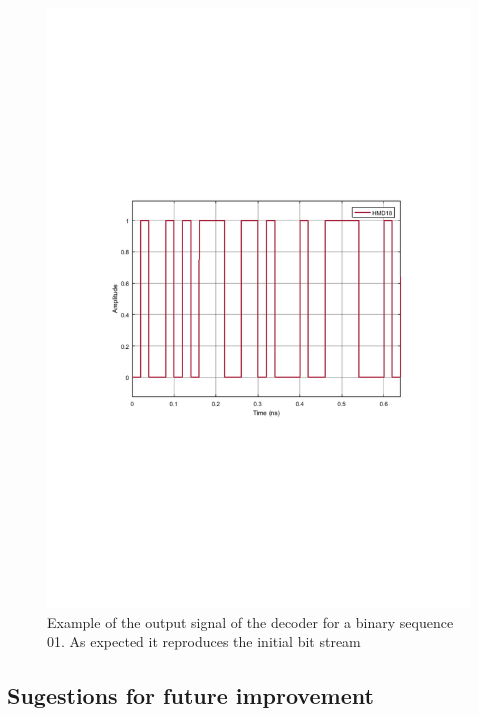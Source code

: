 \begin{figure}[h]
	\centering
	\includegraphics[clip, trim=0.5cm 9cm 0.5cm 9cm, width=\textwidth]{./lib/decoder/figures/MQAM_decoder_output.pdf}
	\caption{Example of the output signal of the decoder for a binary sequence 01. As expected it reproduces the initial bit stream}\label{Decoder_output}
\end{figure}

\subsection*{Sugestions for future improvement}
